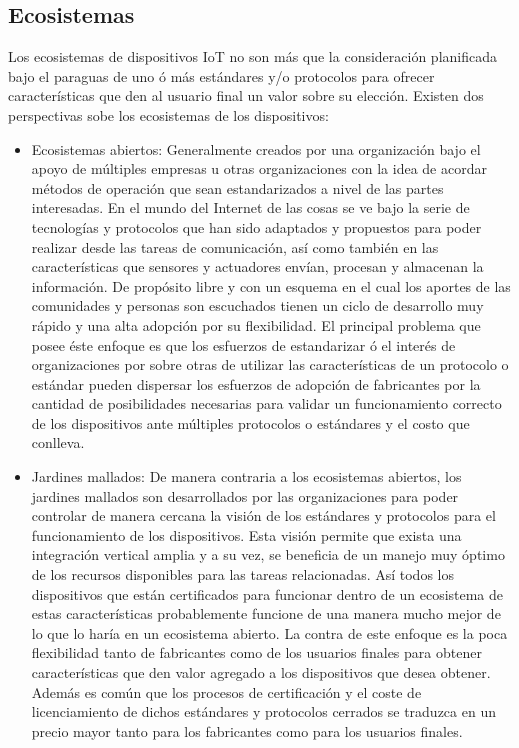 \subsection{Ecosistemas}
Los ecosistemas de dispositivos IoT no son más que la consideración planificada bajo el paraguas de uno ó más estándares y/o protocolos para ofrecer características que den al usuario final un valor sobre su elección. Existen dos perspectivas sobe los ecosistemas de los dispositivos: 
\begin{itemize}
\item Ecosistemas abiertos: Generalmente creados por una organización bajo el apoyo de múltiples empresas u otras organizaciones con la idea de acordar métodos de operación que sean estandarizados a nivel de las partes interesadas. En el mundo del Internet de las cosas se ve bajo la serie de tecnologías y protocolos que han sido adaptados y propuestos para poder realizar desde las tareas de comunicación, así como también en las características que sensores y actuadores envían, procesan y almacenan la información. De propósito libre y con un esquema en el cual los aportes de las comunidades y personas son escuchados tienen un ciclo de desarrollo muy rápido y una alta adopción por su flexibilidad. El principal problema que posee éste enfoque es que los esfuerzos de estandarizar ó el interés de organizaciones por sobre otras de utilizar las características  de un protocolo o estándar pueden dispersar los esfuerzos de adopción de fabricantes por la cantidad de posibilidades necesarias para validar un funcionamiento correcto de los dispositivos ante múltiples protocolos o estándares y el costo que conlleva. 
\item Jardines mallados: De manera contraria a los ecosistemas abiertos, los jardines mallados son desarrollados por las organizaciones para poder controlar de manera cercana la visión de los estándares y protocolos para el funcionamiento de los dispositivos. Esta visión permite que exista una integración vertical amplia y a su vez, se beneficia de un manejo muy óptimo de los recursos disponibles para las tareas relacionadas. Así todos los dispositivos que están certificados para funcionar dentro de un ecosistema de estas características probablemente funcione de una manera mucho mejor de lo que lo haría en un ecosistema abierto. La contra de este enfoque es la poca flexibilidad tanto de fabricantes como de los usuarios finales para obtener características que den valor agregado a los dispositivos que desea obtener\cite{iotInternetSociety}. Además es común que los procesos de certificación y el coste de licenciamiento de dichos estándares y protocolos cerrados se traduzca en un precio mayor tanto para los fabricantes como para los usuarios finales.
\end{itemize}

